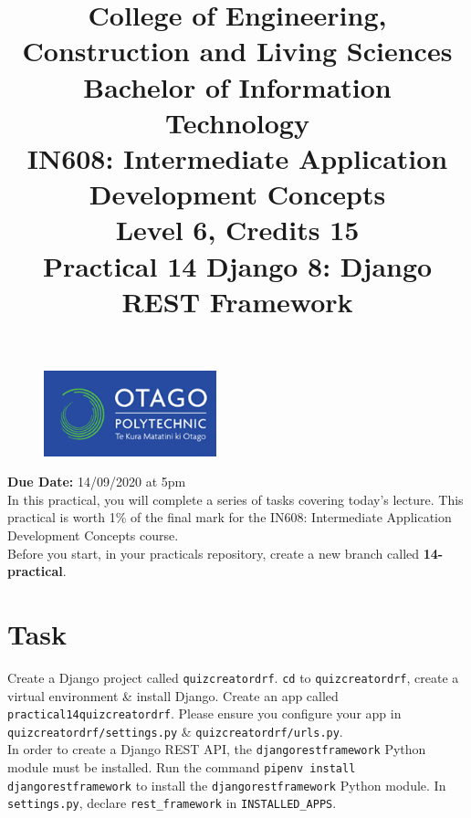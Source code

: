 \documentclass{article}
\author{}
\begin{document}
\begin{figure}
	\centering
	\includegraphics[width=50mm]{./img/logo.png}
\end{figure}

\title{College of Engineering, Construction and Living Sciences\\Bachelor of Information Technology\\IN608: Intermediate Application Development Concepts\\Level 6, Credits 15\\\textbf{Practical 14 Django 8: Django REST Framework}} 
\date{}
\maketitle

\textbf{Due Date:} 14/09/2020 at 5pm \\

In this practical, you will complete a series of tasks covering today's lecture. This practical is worth 1\% of the final mark for the IN608: Intermediate Application Development Concepts course. \\

Before you start, in your practicals repository, create a new branch called \textbf{14-practical}.

\section*{Task} 
Create a Django project called \texttt{quizcreatordrf}. \texttt{cd} to \texttt{quizcreatordrf}, create a virtual environment \& install Django. Create an app called \texttt{practical14quizcreatordrf}. Please ensure you configure your app in \texttt{quizcreatordrf/settings.py} \& \texttt{quizcreatordrf/urls.py}. \\

In order to create a Django REST API, the \texttt{djangorestframework} Python module must be installed. Run the command \texttt{pipenv install djangorestframework} to install the \texttt{djangorestframework} Python module. In \texttt{settings.py}, declare \texttt{rest\_framework} in \texttt{INSTALLED\_APPS}. \\
\end{document}
